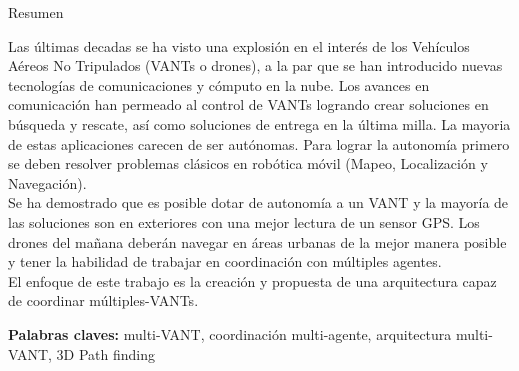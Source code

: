\documentclass[
	11pt, %
]{beamer}
\begin{document}
\begin{frame}
  
  \begin{block}{Resumen}

    {\footnotesize Las últimas decadas se ha visto una explosión en el interés de los Vehículos Aéreos No Tripulados (VANTs o drones), a la par que se han introducido nuevas tecnologías de comunicaciones y cómputo en la nube. Los avances en comunicación han permeado al control de VANTs logrando crear soluciones en búsqueda y rescate, así como soluciones de entrega en la última milla. La mayoria de estas aplicaciones carecen de ser autónomas. Para lograr la autonomía primero se deben resolver problemas clásicos en robótica móvil (Mapeo, Localización y Navegación).\\
      
    Se ha demostrado que es posible dotar de autonomía a un VANT y la mayoría de las soluciones son en exteriores con una mejor lectura de un sensor GPS. Los drones del mañana deberán navegar en áreas urbanas de la mejor manera posible y tener la habilidad de trabajar en coordinación con múltiples agentes.\\
    
    El enfoque de este trabajo es la creación y propuesta de una arquitectura capaz de coordinar múltiples-VANTs.\\
    }
  \medskip 
  
  \noindent \textbf{Palabras claves:} multi-VANT, coordinación multi-agente, arquitectura multi-VANT, 3D Path finding
  
  \end{block}
  
\end{frame}

\end{document}
